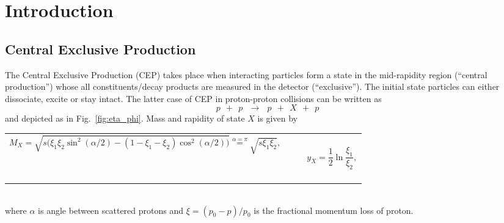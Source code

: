 

\chapter{Introduction}\label{chap:introduction}

\section{Central Exclusive Production}
The Central Exclusive Production (CEP) takes place when interacting particles form a state in the mid-rapidity region (``central production'') whose all constituents/decay products are measured in the detector (``exclusive''). The initial state particles can either dissociate, excite or stay intact. The latter case of CEP in proton-proton collisions can be written as
\begin{equation}\label{eq:cep}%
p~~+~~p~~~\rightarrow~~~p~~+~~X~~+~~p
\end{equation}
and depicted as in Fig.~\ref{fig:eta_phi}. Mass and rapidity of state $X$ is given by\\[-10pt]
\begin{tabulary}{\textwidth}{CCR}
\begin{equation}\label{eq:mass_X}
M_{X} = \sqrt{s\Big(\xi_{1}\xi_{2}\sin^{2}{(\alpha/2)}-(1-\xi_{1}-\xi_{2})\cos^{2}{(\alpha/2)}\Big)} \stackrel{\alpha=\pi}{=} \sqrt{s\xi_{1}\xi_{2}},
\end{equation}~~~~~~~~~~~~~~~~ & ~~ & ~~~~~~
\begin{equation}\label{eq:rapidity_X}
y_{X} = \frac{1}{2}\ln{\frac{\xi_{1}}{\xi_{2}}},
\end{equation}~~~~~~~~
\end{tabulary}\\[-10pt]
where $\alpha$ is angle between scattered protons and $\xi=(p_{0}-p)/p_{0}$ is the fractional momentum loss of proton.\vspace{-5pt}

